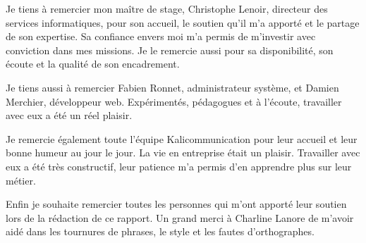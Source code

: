 Je tiens à remercier mon maître de stage, Christophe Lenoir, directeur des services informatiques, pour son accueil, le soutien qu'il m'a apporté et le partage de son expertise. Sa confiance envers moi m'a permis de m'investir avec conviction dans mes missions. Je le remercie aussi pour sa disponibilité, son écoute et la qualité de son encadrement.\newline

Je tiens aussi à remercier Fabien Ronnet, administrateur système, et Damien Merchier, développeur web. Expérimentés, pédagogues et à l'écoute, travailler avec eux a été un réel plaisir.\newline

Je remercie également toute l'équipe Kalicommunication pour leur accueil et leur bonne humeur au jour le jour. La vie en entreprise était un plaisir. Travailler avec eux a été très constructif, leur patience m'a permis d'en apprendre plus sur leur métier.\newline

Enfin je souhaite remercier toutes les personnes qui m'ont apporté leur soutien lors de la rédaction de ce rapport. Un grand merci à Charline Lanore de m'avoir aidé dans les tournures de phrases, le style et les fautes d'orthographes.